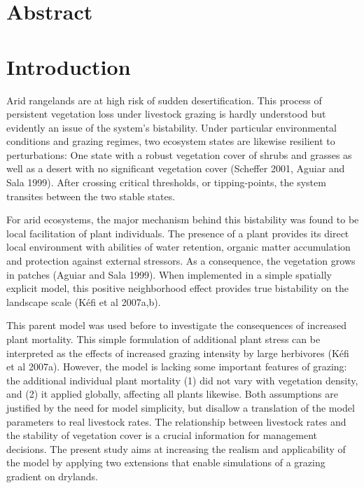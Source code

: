 
\section{Abstract}


\section{Introduction}

Arid rangelands are at high risk of sudden desertification. This process of persistent vegetation loss under livestock grazing is hardly understood but evidently an issue of the system's bistability. Under particular environmental conditions and grazing regimes, two ecosystem states are likewise resilient to perturbations: One state with a robust vegetation cover of shrubs and grasses as well as a desert with no significant vegetation cover (Scheffer 2001, Aguiar and Sala 1999). After crossing critical thresholds, or tipping-points, the system transites between the two stable states. 

For arid ecosystems, the major mechanism behind this bistability was found to be local facilitation of plant individuals. The presence of a plant provides its direct local environment with abilities of water retention, organic matter accumulation and protection against external stressors. As a consequence, the vegetation grows in patches (Aguiar and Sala 1999).  When implemented in a simple spatially explicit model, this positive neighborhood effect provides true bistability on the landscape scale (K\'efi et al 2007a,b).

This parent model was used before to investigate the consequences of increased plant mortality. This simple formulation of additional plant stress can be interpreted as the effects of increased grazing intensity by large herbivores (K\'efi et al 2007a). However, the model is lacking some important features of grazing: the additional individual plant mortality (1) did not vary with vegetation density, and (2) it applied globally, affecting all plants likewise. 
Both assumptions are justified by the need for model simplicity, but disallow a translation of the model parameters to real livestock rates. The relationship between livestock rates and the stability of vegetation cover is a crucial information for management decisions. The present study aims at increasing the realism and applicability of the model by applying two extensions that enable simulations of a grazing gradient on drylands.

